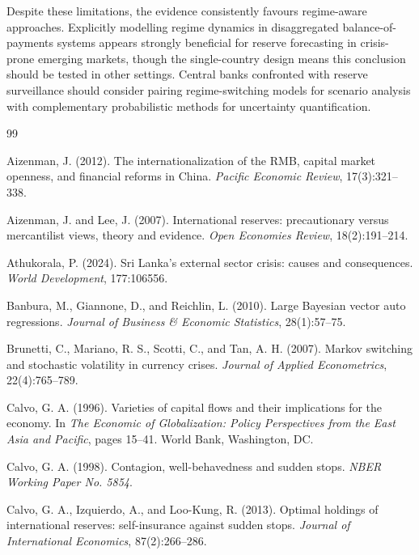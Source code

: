 \documentclass[12pt,a4paper]{article}
\begin{document}
Despite these limitations, the evidence consistently favours regime-aware approaches. Explicitly modelling regime dynamics in disaggregated balance-of-payments systems appears strongly beneficial for reserve forecasting in crisis-prone emerging markets, though the single-country design means this conclusion should be tested in other settings. Central banks confronted with reserve surveillance should consider pairing regime-switching models for scenario analysis with complementary probabilistic methods for uncertainty quantification.


\begin{thebibliography}{99}

Aizenman, J. (2012).
\newblock The internationalization of the RMB, capital market openness, and financial reforms in China.
\newblock \textit{Pacific Economic Review}, 17(3):321--338.

Aizenman, J. and Lee, J. (2007).
\newblock International reserves: precautionary versus mercantilist views, theory and evidence.
\newblock \textit{Open Economies Review}, 18(2):191--214.

Athukorala, P. (2024).
\newblock Sri Lanka's external sector crisis: causes and consequences.
\newblock \textit{World Development}, 177:106556.

Banbura, M., Giannone, D., and Reichlin, L. (2010).
\newblock Large Bayesian vector auto regressions.
\newblock \textit{Journal of Business \& Economic Statistics}, 28(1):57--75.

Brunetti, C., Mariano, R. S., Scotti, C., and Tan, A. H. (2007).
\newblock Markov switching and stochastic volatility in currency crises.
\newblock \textit{Journal of Applied Econometrics}, 22(4):765--789.

Calvo, G. A. (1996).
\newblock Varieties of capital flows and their implications for the economy.
\newblock In \textit{The Economic of Globalization: Policy Perspectives from the East Asia and Pacific}, pages 15--41. World Bank, Washington, DC.

Calvo, G. A. (1998).
\newblock Contagion, well-behavedness and sudden stops.
\newblock \textit{NBER Working Paper No. 5854}.

Calvo, G. A., Izquierdo, A., and Loo-Kung, R. (2013).
\newblock Optimal holdings of international reserves: self-insurance against sudden stops.
\newblock \textit{Journal of International Economics}, 87(2):266--286.


\end{thebibliography}
\end{document}

